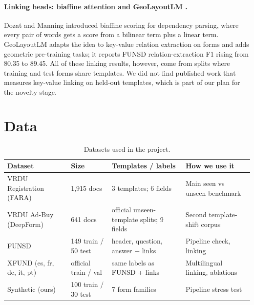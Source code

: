 \documentclass[11pt,a4paper]{article}
\begin{document}
\paragraph{Linking heads: biaffine attention and GeoLayoutLM \cite{biaffine,geolayoutlm}.} Dozat and Manning introduced biaffine scoring for dependency parsing, where every pair of words gets a score from a bilinear term plus a linear term. GeoLayoutLM adapts the idea to key-value relation extraction on forms and adds geometric pre-training tasks; it reports FUNSD relation-extraction F1 rising from 80.35 to 89.45. All of these linking results, however, come from splits where training and test forms share templates. We did not find published work that measures key-value linking on held-out templates, which is part of our plan for the novelty stage.

\section{Data}

\begin{table}[H]
\centering\small
\caption{Datasets used in the project.}
\label{tab:data}
\begin{tabular}{@{}llll@{}}
\toprule
Dataset & Size & Templates / labels & How we use it \\
\midrule
VRDU Registration (FARA) & 1,915 docs & 3 templates; 6 fields & Main seen vs unseen benchmark \\
VRDU Ad-Buy (DeepForm) & 641 docs & official unseen-template splits; 9 fields & Second template-shift corpus \\
FUNSD & 149 train / 50 test & header, question, answer + links & Pipeline check, linking \\
XFUND (es, fr, de, it, pt) & official train / val & same labels as FUNSD + links & Multilingual linking, ablations \\
Synthetic (ours) & 100 train / 30 test & 7 form families & Pipeline stress test \\
\bottomrule
\end{tabular}
\end{table}
\end{document}
